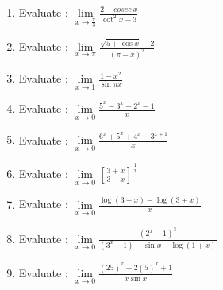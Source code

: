 \documentclass[17pt]{extarticle}
\begin{document}
\begin{multicols}{2}
\begin{enumerate}
\item Evaluate : $ \lim\limits_{ x \to \frac {\pi}{3} } \frac{ 2 -  cosec\ x }{ \cot^2 x - 3  } $
 
\item Evaluate : $ \lim\limits_{ x \to \pi } \frac{ \sqrt{ 5 + \cos x } -2 }{ ( \pi - x )^2  } $
 
\item Evaluate : $ \lim\limits_{ x \to 1 } \frac{ 1 - x^2 }{ \sin \pi x  } $
 
 
 
 \item Evaluate : $ \lim\limits_{ x \to 0 } \frac{ 5^x - 3^x - 2^x - 1 }{ x} $
 
 \item Evaluate : $ \lim\limits_{ x \to 0 } \frac{ 6^x + 5^x + 4^x - 3^{x+1} }{ x} $
 
 \item Evaluate : $ \lim\limits_{ x \to 0 } \left[ \frac{ 3+x }{3-x}\right]^{\frac{1}{x}} $
 

  \item Evaluate : $ \lim\limits_{ x \to 0 } \frac{ \log (3-x) - \log (3+x) }{ x} $
  
  
   \item Evaluate : $ \lim\limits_{ x \to 0 } \frac{ \left(2^x - 1\right)^3 }{ (3^x - 1)\; \cdot \;\sin x \; \cdot \; \log (1+x)} $
  
  
   \item Evaluate : $ \lim\limits_{ x \to 0 } \frac{ (25)^x - 2(5)^x +1}{ x\sin x} $
 
\end{enumerate} 


\end{multicols}
 
\end{document}
